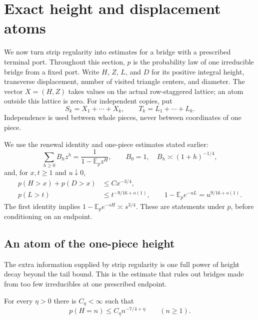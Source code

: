 \section{Exact height and displacement atoms}\label{c:atoms-section}

We now turn strip regularity into estimates for a bridge with a prescribed
terminal port.  Throughout this section, $p$ is the probability law of one
irreducible bridge from a fixed port.  Write $H$, $Z$, $L$, and $D$
for its positive integral height, transverse displacement, number of visited
triangle centers, and diameter.  The vector $X=(H,Z)$ takes values on the
actual row-staggered lattice; an atom outside this lattice is zero.  For
independent copies, put
\[
 S_k=X_1+\cdots+X_k,\qquad
 T_k=L_1+\cdots+L_k.
\]
Independence is used between whole pieces, never between coordinates of
one piece.

We use the renewal identity and one-piece estimates stated earlier:
\begin{equation}\label{c:renewal-atom-inputs}
 \sum_{h\ge0}B_hz^h=\frac1{1-\mathbb E_p z^H},\qquad
 B_0=1,\quad B_h\asymp(1+h)^{-1/4},
\end{equation}
and, for $x,t\ge1$ and $u\downarrow0$,
\begin{equation}\label{c:tail-atom-inputs}
 \begin{split}
 p(H>x)+p(D>x)&\le Cx^{-3/4},\\
 p(L>t)&\le t^{-9/16+o(1)},\qquad
 1-\mathbb E_p e^{-uL}=u^{9/16+o(1)}.
 \end{split}
\end{equation}
The first identity implies
$1-\mathbb E_p e^{-sH}\asymp s^{3/4}$.
These are statements under $p$, before conditioning on an endpoint.

\subsection{An atom of the one-piece height}

The extra information supplied by strip regularity is one full power of
height decay beyond the tail bound.  This is the estimate that rules out
bridges made from too few irreducibles at one prescribed endpoint.

\begin{proposition}\label{c:height-atom}
For every $\eta>0$ there is $C_\eta<\infty$ such that
\[
 p(H=n)\le C_\eta n^{-7/4+\eta}\qquad(n\ge1).
\]
\end{proposition}

